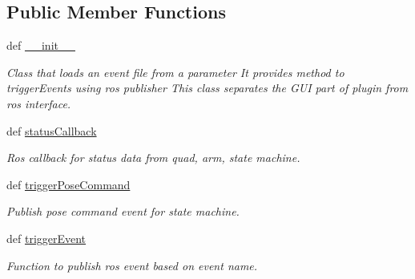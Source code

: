 \subsection*{Public Member Functions}
\begin{DoxyCompactItemize}
\item 
def \hyperlink{classaerial__autonomy_1_1ros__event__trigger_1_1RosEventTrigger_a740d1aee68ed5c95110242f03ce79e5e}{\-\_\-\-\_\-init\-\_\-\-\_\-}
\begin{DoxyCompactList}\small\item\em Class that loads an event file from a parameter It provides method to trigger\-Events using ros publisher This class separates the G\-U\-I part of plugin from ros interface. \end{DoxyCompactList}\item 
def \hyperlink{classaerial__autonomy_1_1ros__event__trigger_1_1RosEventTrigger_a62ba54708585892d5f227682954fc1c6}{status\-Callback}
\begin{DoxyCompactList}\small\item\em Ros callback for status data from quad, arm, state machine. \end{DoxyCompactList}\item 
def \hyperlink{classaerial__autonomy_1_1ros__event__trigger_1_1RosEventTrigger_a7277f5df8fedc93bf3616535ea588ba8}{trigger\-Pose\-Command}
\begin{DoxyCompactList}\small\item\em Publish pose command event for state machine. \end{DoxyCompactList}\item 
def \hyperlink{classaerial__autonomy_1_1ros__event__trigger_1_1RosEventTrigger_aa7f5a5b057de80bf818642d851fabac3}{trigger\-Event}
\begin{DoxyCompactList}\small\item\em Function to publish ros event based on event name. \end{DoxyCompactList}\end{DoxyCompactItemize}
